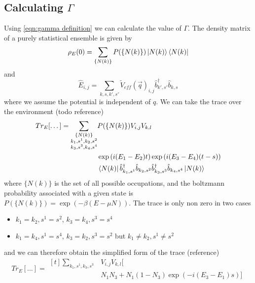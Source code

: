 \subsection{Calculating \(\Gamma \)}
Using \cref{eqn:gamma definition}
we can calculate the value of \(\Gamma \).
The
density matrix of a purely
statistical ensemble is given
by~\cite{sakurai_napolitano_2020}
\begin{equation}
    \rho_E(0) = \sum_{\{N(k)\}}
    P(\{N(k)\})
    \ket{N(k)} \bra{N(k)}
\end{equation}
and
\begin{equation}
    \hat{E}_{i,j} = \sum_{k,s,k',s'}
    {\tilde{V}_{eff}(\vec{q})}_{i,j}
    \hat{b}^\dagger_{k',s'}\hat{b}_{k,s}
\end{equation}
where we assume the potential
is independent of \(q\). We can
take the trace over the
environment (todo reference)
\begin{equation}
    Tr_E[\dots]  = \begin{aligned}[t]
        \sum_{\substack{\{N(k)\}                             \\
        k_1,s^1,k_2,s^2                                      \\
                k_3,s^3,k_4,s^4 }}
         & P(\{N(k)\}) V_{i,j} V_{k,l}                       \\
         & \exp{(i(E_1 - E_2) t)} \exp{(i(E_3 - E_4) (t-s))} \\
         & \bra{N(k)}
        \hat{b}_{k_1,s^1}^\dagger{} \hat{b}_{k_2,s^2}
        \hat{b}_{k_3,s^3}^\dagger{} \hat{b}_{k_4,s^4}
        \ket{N(k)}
    \end{aligned}
\end{equation}
where \( \{N(k)\} \) is the set of
all possible occupations, and
the boltzmann
probability associated with a
given state is
\(P(\{N(k)\}) = \exp{(-\beta{}(E-\mu N))}\).
The trace is only non zero in two
cases
\begin{itemize}
    \item \(k_1=k_2, s^1=s^2\),
          \(k_3=k_4, s^3=s^4\)
    \item \(k_1=k_4, s^1=s^4\),
          \(k_3=k_2, s^3=s^2\) but
          \(k_1\neq{}k_2, s^1\neq{}s^2\)
\end{itemize}
and we can therefore obtain the
simplified form of the trace (reference)
\begin{equation}
    Tr_E[\dots] = \begin{aligned}[t]
        \sum_{k_1,s^1,k_3,s^3 }
         & V_{i,j} V_{k,l} [ \\
         & N_1 N_3
                + N_1 (1 - N_3) \exp{(-i(E_3 - E_1)s)}]
    \end{aligned}
\end{equation}
